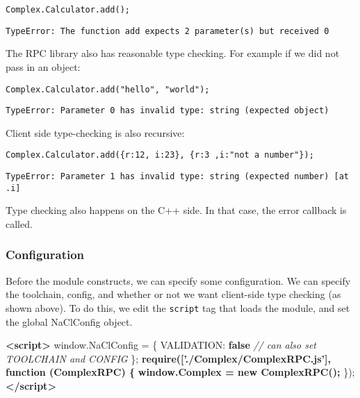\documentclass[]{article}
\newenvironment{Shaded}{}{}
\newcommand{\KeywordTok}[1]{\textcolor[rgb]{0.00,0.44,0.13}{\textbf{{#1}}}}
\newcommand{\DataTypeTok}[1]{\textcolor[rgb]{0.56,0.13,0.00}{{#1}}}
\newcommand{\CommentTok}[1]{\textcolor[rgb]{0.38,0.63,0.69}{\textit{{#1}}}}
\newcommand{\OtherTok}[1]{\textcolor[rgb]{0.00,0.44,0.13}{{#1}}}
\newcommand{\FunctionTok}[1]{\textcolor[rgb]{0.02,0.16,0.49}{{#1}}}
\newcommand{\ErrorTok}[1]{\textcolor[rgb]{1.00,0.00,0.00}{\textbf{{#1}}}}
\newcommand{\NormalTok}[1]{{#1}}
\begin{document}
\begin{verbatim}
Complex.Calculator.add();
\end{verbatim}

\begin{verbatim}
TypeError: The function add expects 2 parameter(s) but received 0
\end{verbatim}

The RPC library also has reasonable type checking. For example if we did
not pass in an object:

\begin{verbatim}
Complex.Calculator.add("hello", "world");
\end{verbatim}

\begin{verbatim}
TypeError: Parameter 0 has invalid type: string (expected object)
\end{verbatim}

Client side type-checking is also recursive:

\begin{verbatim}
Complex.Calculator.add({r:12, i:23}, {r:3 ,i:"not a number"});
\end{verbatim}

\begin{verbatim}
TypeError: Parameter 1 has invalid type: string (expected number) [at .i]
\end{verbatim}

Type checking also happens on the C++ side. In that case, the error
callback is called.

\subsubsection{Configuration}\label{configuration}

Before the module constructs, we can specify some configuration. We can
specify the toolchain, config, and whether or not we want client-side
type checking (as shown above). To do this, we edit the \texttt{script}
tag that loads the module, and set the global NaClConfig object.

\begin{Shaded}
\begin{Highlighting}[]
\KeywordTok{<script>}
\OtherTok{window}\NormalTok{.}\FunctionTok{NaClConfig} \NormalTok{= \{}
  \DataTypeTok{VALIDATION}\NormalTok{: }\KeywordTok{false} \CommentTok{// can also set TOOLCHAIN and CONFIG}
\NormalTok{\};}
\ErrorTok{require(['./Complex/ComplexRPC.js'], function (ComplexRPC) \{}
\ErrorTok{    window.Complex = new ComplexRPC();}
\NormalTok{\});}
\KeywordTok{</script>}
\end{Highlighting}
\end{Shaded}
\end{document}
